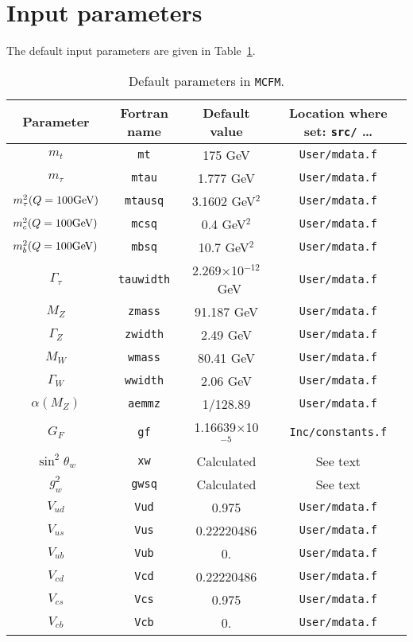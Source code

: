 \documentclass[12pt]{article}
\begin{document}
\section{Input parameters}
The default input parameters are given in Table~\ref{default}.
\begin{table}
\begin{center}
\begin{tabular}{|c|c|c|c|} \hline
Parameter & Fortran name & Default value & Location where set:
{\tt src/} \ldots                \\ 
\hline
$m_t$            & {\tt mt}      & 175 GeV             &{\tt User/mdata.f}   \\
$m_\tau$         & {\tt mtau}      & 1.777 GeV           &{\tt User/mdata.f}   \\
$m^2_\tau(Q=100\mbox{GeV})$& {\tt mtausq}  & 3.1602 GeV$^2$      &{\tt User/mdata.f}   \\
$m^2_c(Q=100\mbox{GeV})$   & {\tt mcsq}    & 0.4  GeV$^2$        &{\tt User/mdata.f}   \\
$m^2_b(Q=100\mbox{GeV})$   & {\tt mbsq}    & 10.7 GeV$^2$        &{\tt User/mdata.f}   \\
$\Gamma_\tau$    & {\tt tauwidth}& 2.269$\times$10$^{-12}$~GeV
                                                       &{\tt User/mdata.f}   \\
$M_Z$            & {\tt zmass}   & 91.187 GeV          &{\tt User/mdata.f}   \\
$\Gamma_Z$       & {\tt zwidth}  & 2.49 GeV            &{\tt User/mdata.f}   \\
$M_W$            & {\tt wmass}   & 80.41 GeV           &{\tt User/mdata.f}   \\
$\Gamma_W$       & {\tt wwidth}  & 2.06 GeV            &{\tt User/mdata.f}   \\
$\alpha(M_Z)$    & {\tt aemmz}   & 1/128.89            &{\tt User/mdata.f}   \\
$G_F$            & {\tt gf}      & 1.16639$\times$10$^{-5}$
                                                       &{\tt Inc/constants.f}\\
$\sin^2 \theta_w$& {\tt xw}      & Calculated          & See text             \\
$g^2_w$          & {\tt gwsq}    & Calculated          & See text             \\
$V_{ud}$         & {\tt Vud}     & 0.975               &{\tt User/mdata.f}   \\
$V_{us}$         & {\tt Vus}     & 0.22220486          &{\tt User/mdata.f}   \\
$V_{ub}$         & {\tt Vub}     & 0.                  &{\tt User/mdata.f}   \\
$V_{cd}$         & {\tt Vcd}     & 0.22220486          &{\tt User/mdata.f}   \\
$V_{cs}$         & {\tt Vcs}     & 0.975               &{\tt User/mdata.f}   \\
$V_{cb}$         & {\tt Vcb}     & 0.                  &{\tt User/mdata.f}   \\
\hline
\end{tabular}
\caption{Default parameters in {\tt MCFM}.}
\label{default} 
\end{center}
\end{table}
\end{document}
